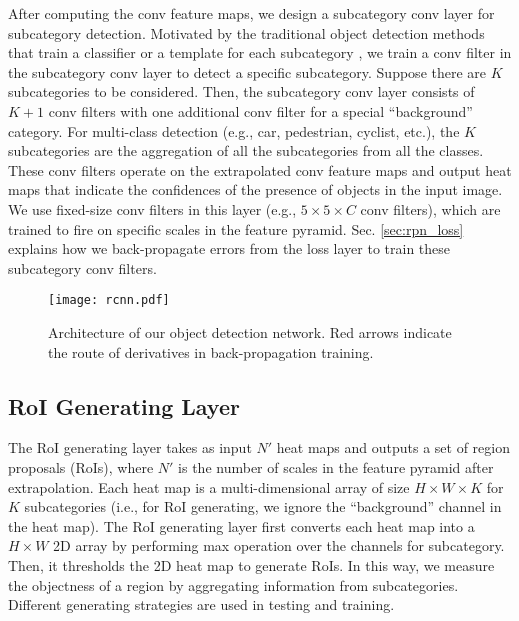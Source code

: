 \documentclass[10pt,twocolumn,letterpaper]{article}
\begin{document}
After computing the conv feature maps, we design a subcategory conv layer for subcategory detection. Motivated by the traditional object detection methods that train a classifier or a template for each subcategory \cite{felzenszwalb2010object,malisiewicz2011ensemble,xiang2015data}, we train a conv filter in the subcategory conv layer to detect a specific subcategory. Suppose there are $K$ subcategories to be considered. Then, the subcategory conv layer consists of $K+1$ conv filters with one additional conv filter for a special ``background'' category. For multi-class detection (e.g., car, pedestrian, cyclist, etc.), the $K$ subcategories are the aggregation of all the subcategories from all the classes. These conv filters operate on the extrapolated conv feature maps and output heat maps that indicate the confidences of the presence of objects in the input image. We use fixed-size conv filters in this layer (e.g., $5 \times 5 \times C$ conv filters), which are trained to fire on specific scales in the feature pyramid. Sec. \ref{sec:rpn_loss} explains how we back-propagate errors from the loss layer to train these subcategory conv filters.

\begin{figure*} \small 
	\centering
	\texttt{[image: rcnn.pdf]}
	\caption{Architecture of our object detection network. Red arrows indicate the route of derivatives in back-propagation training.}
	\label{fig:rcnn}
	\vspace{-4mm}
\end{figure*}

\subsection{RoI Generating Layer}

The RoI generating layer takes as input $N'$ heat maps and outputs a set of region proposals (RoIs), where $N'$ is the number of scales in the feature pyramid after extrapolation. Each heat map is a multi-dimensional array of size $H \times W \times K$ for $K$ subcategories (i.e., for RoI generating, we ignore the ``background'' channel in the heat map). The RoI generating layer first converts each heat map into a $H \times W$ 2D array by performing max operation over the channels for subcategory. Then, it thresholds the 2D heat map to generate RoIs. In this way, we measure the objectness of a region by aggregating information from subcategories. Different generating strategies are used in testing and training.
\end{document}

